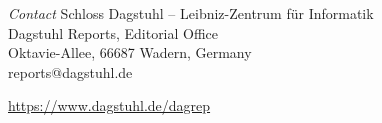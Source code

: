 \documentclass[a4paper,USenglish]{dagrep-master-v2021}
\begin{document}
\begin{publicationinfo}
\medskip
\emph{Contact}\newline
Schloss Dagstuhl -- Leibniz-Zentrum f\"ur Informatik\\
Dagstuhl Reports, Editorial Office\\
Oktavie-Allee, 66687 Wadern, Germany\\ 
reports@dagstuhl.de


\vfill

\href{https://www.dagstuhl.de/dagrep}{https://www.dagstuhl.de/dagrep}

  
\end{publicationinfo}
\end{document}
